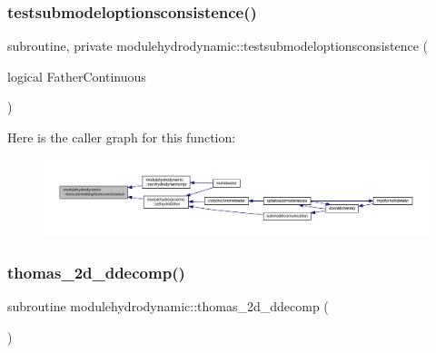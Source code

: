 \mbox{\label{namespacemodulehydrodynamic_ab0672dab245838d200adce9cad0f729e}} 
\subsubsection{\texorpdfstring{testsubmodeloptionsconsistence()}{testsubmodeloptionsconsistence()}}
{\footnotesize\ttfamily subroutine, private modulehydrodynamic\+::testsubmodeloptionsconsistence (\begin{DoxyParamCaption}\item[{logical}]{Father\+Continuous }\end{DoxyParamCaption})\hspace{0.3cm}{\ttfamily [private]}}

Here is the caller graph for this function\+:\nopagebreak
\begin{figure}[H]
\begin{center}
\leavevmode
\includegraphics[width=350pt]{namespacemodulehydrodynamic_ab0672dab245838d200adce9cad0f729e_icgraph}
\end{center}
\end{figure}
\mbox{\label{namespacemodulehydrodynamic_ac03117b3b11b92ebf56eb60fad884b0b}} 
\subsubsection{\texorpdfstring{thomas\+\_\+2d\+\_\+ddecomp()}{thomas\_2d\_ddecomp()}}
{\footnotesize\ttfamily subroutine modulehydrodynamic\+::thomas\+\_\+2d\+\_\+ddecomp (\begin{DoxyParamCaption}{ }\end{DoxyParamCaption})\hspace{0.3cm}{\ttfamily [private]}}

